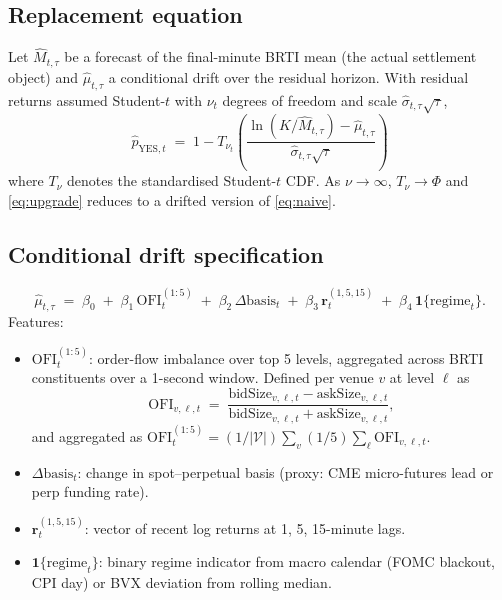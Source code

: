 \documentclass[11pt]{article}
\begin{document}
\subsection{Replacement equation}

Let $\hat M_{t,\tau}$ be a forecast of the final-minute BRTI mean (the actual settlement object) and $\hat\mu_{t,\tau}$ a conditional drift over the residual horizon. With residual returns assumed Student-$t$ with $\nu_t$ degrees of freedom and scale $\hat\sigma_{t,\tau}\sqrt{\tau}$,
\begin{equation}
\boxed{\;\hat p_{\text{YES},t} \;=\; 1 - T_{\nu_t}\!\left(\frac{\ln(K / \hat M_{t,\tau}) - \hat\mu_{t,\tau}}{\hat\sigma_{t,\tau}\sqrt{\tau}}\right)\;}
\label{eq:upgrade}
\end{equation}
where $T_{\nu}$ denotes the standardised Student-$t$ CDF. As $\nu \to \infty$, $T_{\nu} \to \Phi$ and \eqref{eq:upgrade} reduces to a drifted version of \eqref{eq:naive}.

\subsection{Conditional drift specification}

\begin{equation}
\hat\mu_{t,\tau} \;=\; \beta_0 \;+\; \beta_1\,\mathrm{OFI}^{(1:5)}_t \;+\; \beta_2\,\Delta\mathrm{basis}_t \;+\; \beta_3\,\mathbf{r}_t^{(1,5,15)} \;+\; \beta_4\,\mathbf{1}\{\text{regime}_t\}.
\end{equation}
Features:
\begin{itemize}
\item $\mathrm{OFI}^{(1:5)}_t$: order-flow imbalance over top 5 levels, aggregated across BRTI constituents over a 1-second window. Defined per venue $v$ at level $\ell$ as
\[
\mathrm{OFI}_{v,\ell,t} \;=\; \frac{\mathrm{bidSize}_{v,\ell,t} - \mathrm{askSize}_{v,\ell,t}}{\mathrm{bidSize}_{v,\ell,t} + \mathrm{askSize}_{v,\ell,t}},
\]
and aggregated as $\mathrm{OFI}^{(1:5)}_t = (1/|\mathcal{V}|) \sum_v (1/5)\sum_\ell \mathrm{OFI}_{v,\ell,t}$.
\item $\Delta\mathrm{basis}_t$: change in spot--perpetual basis (proxy: CME micro-futures lead or perp funding rate).
\item $\mathbf{r}_t^{(1,5,15)}$: vector of recent log returns at 1, 5, 15-minute lags.
\item $\mathbf{1}\{\text{regime}_t\}$: binary regime indicator from macro calendar (FOMC blackout, CPI day) or BVX deviation from rolling median.
\end{itemize}
\end{document}
